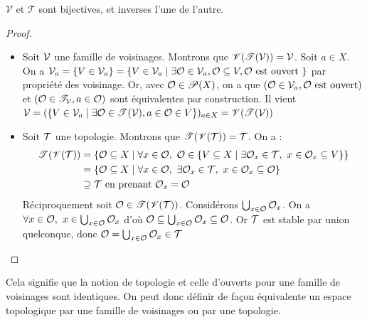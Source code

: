 \begin{proposition}
    $\mathscr{V}$ et $\mathscr{T}$ sont bijectives, et inverses l'une de l'autre.
\end{proposition}
\begin{proof}
\begin{itemize}
    \item Soit $\mathcal{V}$ une famille de voisinages. Montrons que $\mathscr{V}(\mathscr{T}(\mathcal{V}))=\mathcal{V}$. Soit $a\in X$. On a $\mathcal{V}_a = \{V\in\mathcal{V}_a\}=\{V\in\mathcal{V}_a\mid\exists\mathcal{O}\in\mathcal{V}_a,\mathcal{O}\subseteq V,\mathcal{O}\text{ est ouvert }\}$ par propriété des voisinage. Or, avec $\mathcal{O}\in\mathscr{P}(X)$, on a que $(\mathcal{O}\in\mathcal{V}_a,\mathcal{O}\text{ est ouvert})$ et $(\mathcal{O}\in\mathscr{T}_{\mathcal{V}}, a\in \mathcal{O})$ sont équivalentes par construction. Il vient $\mathcal{V}=(\{V\in\mathcal{V}_a\mid\exists\mathcal{O}\in\mathscr{T}(\mathcal{V}),a\in\mathcal{O}\in V\})_{a\in X}=\mathscr{V}(\mathscr T(\mathcal{V}))$
    \item Soit $\mathcal{T}$ une topologie. Montrons que $\mathscr{T}(\mathscr{V}(\mathcal{T}))=\mathcal{T}$. On a :
    \begin{align*}
    \mathscr{T}(\mathscr{V}(\topologie))&=\{\ouvert\subseteq X\mid\forall x\in\ouvert,\ \ouvert\in\{V\subseteq X\mid\exists \ouvert_x\in\topologie,\ x\in\ouvert_x\subseteq V\}\}\\
    &=\{\ouvert\subseteq X\mid\forall x\in\ouvert,\ \exists\ouvert_x\in\topologie,\ x\in\ouvert_x\subseteq\ouvert\}\\
    &\supseteq \topologie\text{ en prenant }\ouvert_x=\ouvert
    \end{align*}
    Réciproquement soit $\mathcal{O}\in\mathscr{T}(\mathscr{V}(\mathcal{T}))$. Considérons $\bigcup_{x\in\mathcal{O}}\mathcal{O}_x$. On a $\forall x\in\ouvert,\ x\in\bigcup_{x\in\ouvert}\ouvert_x$ d'où $\mathcal{O}\subseteq\bigcup_{x\in\mathcal{O}}\mathcal{O}_x\subseteq\mathcal{O}$. Or $\mathcal{T}$ est stable par union quelconque, donc $\mathcal{O}=\bigcup_{x\in\mathcal{O}}\mathcal{O}_x\in\mathcal{T}$
\end{itemize}
\end{proof}
Cela signifie que la notion de topologie et celle d'ouverts pour une famille de voisinages sont identiques. On peut donc définir de façon équivalente un espace topologique par une famille de voisinages ou par une topologie.
